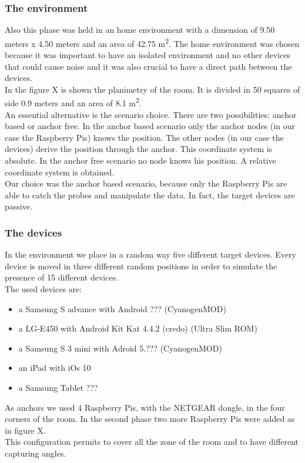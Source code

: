 \subsubsection{The environment}
Also this phase was held in an home environment with a dimension of 9.50 meters x 4.50 meters and an area of 42.75 m\textsuperscript{2}.
The home environment was chosen because it was important to have an isolated environment and no other devices that could cause noise and it was also crucial to have a direct path between the devices.\\
In the figure X is shown the planimetry of the room. It is divided in 50 squares of side 0.9 meters and an area of 8.1 m\textsuperscript{2}.\\
\linebreak
An essential alternative is the scenario choice. There are two possibilities: anchor based or anchor free. In the anchor based scenario only the anchor nodes (in our case the Raspberry Pis) knows the position. The other nodes (in our case the devices) derive the position through the anchor. This coordinate system is absolute. In the anchor free scenario no node knows his position. A relative coordinate system is obtained.\\
Our choice was the anchor based scenario, because only the Raspberry Pis are able to catch the probes and manipulate the data. In fact, the target devices are passive.
\subsubsection{The devices}
In the environment we place in a random way five different target devices. Every device is moved in three different random positions in order to simulate the presence of 15 different devices.\\
The used devices are:
\begin{itemize}
\item a Samsung S advance with Android ??? (CyanogenMOD)
\item a LG-E450 with Android Kit Kat 4.4.2 (credo) (Ultra Slim ROM)
\item a Samsung S 3 mini with Adroid 5.??? (CyanogenMOD)
\item an iPad with iOs 10
\item a Samsung Tablet ???
\end{itemize}
As anchors we used 4 Raspberry Pis, with the NETGEAR dongle, in the four corners of the room. In the second phase two more Raspberry Pis were added as in figure X. \\
This configuration permits to cover all the zone of the room and to have different capturing angles.

